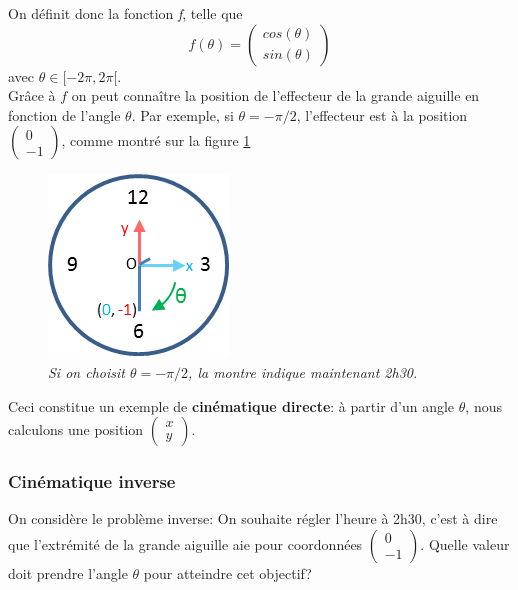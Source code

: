 \documentclass{article}
\begin{document}
On d\'efinit donc la fonction \textit{f}, telle que
 \begin{displaymath}  
f(\theta) =  \begin{pmatrix}
cos(\theta) \\
sin(\theta)
\end{pmatrix}
 \end{displaymath}
avec \begin{math} \theta \in [-2\pi, 2\pi[ \end{math}. \\

Gr\^ace \`a $f$ on peut conna\^itre la position de l'effecteur de la grande aiguille en fonction de l'angle $\theta$. Par exemple, si $\theta = -\pi / 2$,
l'effecteur est \`a la position $\begin{pmatrix}
0 \\
-1
\end{pmatrix}$, comme montr\'e sur la figure \ref{2h30}

\begin{figure}[htb]
  \centering
    \includegraphics[]{watchrotcart}
  \caption{
          \textit{Si on choisit $\theta = -\pi / 2$, la montre indique maintenant 2h30.}}
		   \label{2h30}
\end{figure}

Ceci constitue un exemple de \textbf{cin\'ematique directe}: \`a partir d'un angle $\theta$, nous calculons une position
$\begin{pmatrix} x \\ y \end{pmatrix}$.

\subsubsection*{Cin\'ematique inverse}
On consid\`ere le probl\`eme inverse:
On souhaite r\'egler l'heure \`a 2h30,  c'est \`a dire que l'extr\'emit\'e de la grande aiguille aie pour coordonn\'ees $\begin{pmatrix} 0 \\ -1 \end{pmatrix}$.
Quelle valeur doit prendre l'angle $\theta$ pour atteindre cet objectif? \\
\end{document}
